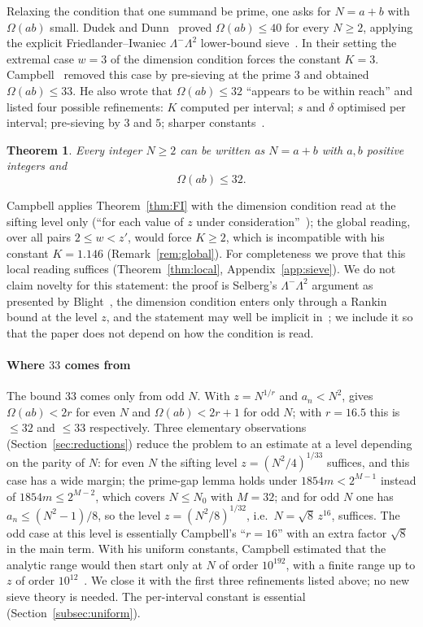 \documentclass[preprint,11pt]{elsarticle}
\newtheorem{theorem}{Theorem}[section]
\theoremstyle{definition}
\theoremstyle{remark}
\newcommand{\C}{\cite{Campbell2026}}
\numberwithin{equation}{section}
\begin{document}
Relaxing the condition that one summand be prime, one asks for $N=a+b$
with $\Omega(ab)$ small. Dudek and Dunn~\cite{DudekDunn} proved
$\Omega(ab)\le 40$ for every $N\ge2$, applying the explicit
Friedlander--Iwaniec $\Lambda^-\Lambda^2$ lower-bound sieve~\cite{FI2010}.
In their setting the extremal case $w=3$ of the dimension condition forces
the constant $K=3$. Campbell~\C{} removed this case by pre-sieving at the
prime $3$ and obtained $\Omega(ab)\le 33$. He also wrote that
$\Omega(ab)\le 32$ ``appears to be within reach'' and listed four possible
refinements: $K$ computed per interval; $s$ and $\delta$ optimised per
interval; pre-sieving by $3$ and $5$; sharper constants~\cite[\S6]{Campbell2026}.

\begin{theorem}\label{thm:main}
Every integer $N\ge 2$ can be written as $N=a+b$ with
$a,b$ positive integers and
\[
  \Omega(ab)\le 32 .
\]
\end{theorem}

Campbell applies Theorem~\ref{thm:FI} with the dimension condition read at
the sifting level only (``for each value of $z$ under
consideration''~\cite[(2.1)]{Campbell2026}); the global reading, over all
pairs $2\le w<z'$, would force $K\ge2$, which is incompatible with his
constant $K=1.146$ (Remark~\ref{rem:global}). For completeness we prove
that this local reading suffices (Theorem~\ref{thm:local},
Appendix~\ref{app:sieve}). We do not claim novelty for this statement: the
proof is Selberg's $\Lambda^-\Lambda^2$ argument as presented by
Blight~\cite{Blight2010}, the dimension condition enters only through a
Rankin bound at the level $z$, and the statement may well be implicit
in~\cite[\S7]{FI2010}; we include it so that the paper does not depend on
how the condition is read.

\paragraph{Where $33$ comes from}
The bound $33$ comes only from odd $N$. With $z=N^{1/r}$ and $a_n<N^2$,
\cite[Lemma~5.2]{Campbell2026} gives $\Omega(ab)<2r$ for even $N$ and
$\Omega(ab)<2r+1$ for odd $N$; with $r=16.5$ this is $\le32$ and $\le33$
respectively. Three elementary observations
(Section~\ref{sec:reductions}) reduce the problem to an estimate at a
level depending on the parity of $N$: for even $N$ the sifting level
$z=(N^2/4)^{1/33}$ suffices, and this case has a wide margin; the prime-gap lemma \cite[Lemma~5.1]{Campbell2026}
holds under $1854m<2^{M-1}$ instead of $1854m\le2^{M-2}$, which covers
$N\le N_0$ with $M=32$; and for odd $N$ one has $a_n\le(N^2-1)/8$, so the
level $z=(N^2/8)^{1/32}$, i.e.\ $N=\sqrt8\,z^{16}$, suffices. The odd case
at this level is essentially Campbell's
``$r=16$'' with an extra factor $\sqrt8$ in the main term. With his uniform
constants, Campbell estimated that the analytic range would then start
only at $N$ of order $10^{192}$, with a finite range up to $z$ of order
$10^{12}$~\cite[\S6]{Campbell2026}. We close it with the first three
refinements listed above; no new sieve theory is needed. The per-interval
constant is essential (Section~\ref{subsec:uniform}).
\end{document}
